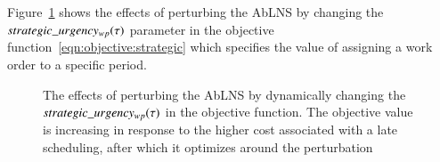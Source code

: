 Figure~\ref{fig:responses:value_change} shows the effects of
perturbing the AbLNS by changing the $strategic\_urgency_{w p}(\tau)$ parameter in the objective
function~\ref{eqn:objective:strategic} which specifies the value of assigning a
work order to a specific period.

\begin{figure}[H]%
	\centering
	\resizebox{\linewidth}{!}{
		
	}
	\caption{The effects of perturbing the AbLNS by dynamically changing the
	$strategic\_urgency_{w p}(\tau)$ in the objective function. The objective value
	is increasing in response to the higher cost associated with a late
	scheduling, after which it optimizes around the perturbation
	}\label{fig:responses:value_change}
\end{figure}
 
